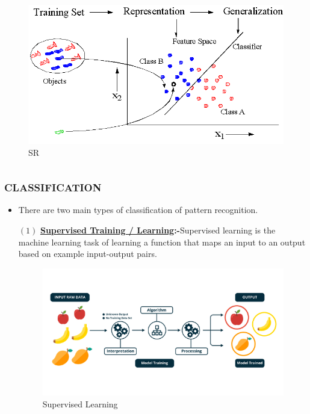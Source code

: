 \documentclass{beamer}
\begin{document}
\begin{frame}
\begin{columns}

\begin{column}{.4\textwidth}
\begin{figure}
\includegraphics[width=\textwidth]{class.png}\pause
{}
\caption{SR}
\end{figure}
\end{column}



\end{columns}
\end{frame}

\begin{frame}
\transsplitverticalout

\frametitle{CLASSIFICATION}\pause
\begin{itemize}
\item There are two main types of classification of pattern recognition.\pause
\end{itemize}
\begin{enumerate}
\item [$(1)$]{\bf \underline {Supervised Training / Learning}:-}Supervised learning is the machine learning task of learning a function that maps an input to an output based on example input-output pairs.\pause
\begin{figure}
\includegraphics[width=.5\textwidth]{sup.png}
\caption{Supervised Learning}\pause
\end{figure}
\end{enumerate}

\end{frame}
\end{document}
